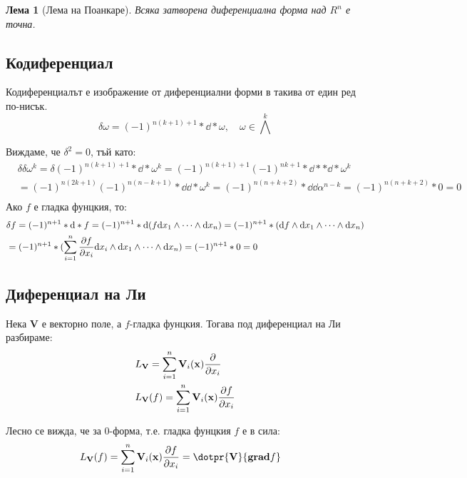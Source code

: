 \documentclass[12pt]{article}
\newtheorem{lemma}{Лема}
\begin{document}
\begin{large}
\begin{lemma}[Лема на Поанкаре]
  Всяка затворена диференциална форма над $R^n$ е точна.
\end{lemma}

\subsection{Кодиференциал}
Кодиференциалът е изображение от диференциални форми в такива от един ред по-нисък.
\[
  \delta \omega=(-1)^{n(k+1)+1}\ast \dd \ast \omega, \quad \omega \in {\bigwedge}^k
\]

Виждаме, че $\delta^2=0$, тъй като:
\begin{align*}
  &\delta \delta \omega^k = \delta (-1)^{n(k+1)+1}\ast \dd \ast \omega^k = (-1)^{n(k+1)+1} (-1)^{nk+1} \ast \dd \ast \ast \dd \ast \omega^k \\
  &= (-1)^{n(2k+1)} (-1)^{n(n-k+1)} \ast \dd \dd \ast \omega^k = (-1)^{n(n+k+2)} \ast \dd \dd \alpha^{n-k} = (-1)^{n(n+k+2)} \ast 0 = 0\\
\end{align*}
Ако $f$ е гладка фунцкия, то:
\begin{align*}
  &\delta f = (-1)^{n+1} \ast \dd \ast f = (-1)^{n+1} \ast \dd(f \dd x_1 \wedge \cdots \wedge \dd x_n) = (-1)^{n+1} \ast (\dd f \wedge \dd x_1 \wedge \cdots \wedge \dd x_n) \\
  &=(-1)^{n+1} \ast (\sum_{i=1}^{n} \pdv{f}{x_i} \dd x_i \wedge \dd x_1 \wedge \cdots \wedge \dd x_n) = (-1)^{n+1} \ast 0 = 0
\end{align*}

\subsection{Диференциал на Ли}
Нека $\mathbf{V}$ е векторно поле, а $f$-гладка фунцкия. Тогава под диференциал на Ли разбираме:
\begin{align*}
  &L_\mathbf{V} = \sum_{i=1}^{n}\mathbf{V}_i(\mathbf{x})\pdv{}{x_i} \\
  &L_\mathbf{V}(f)=\sum_{i=1}^{n}\mathbf{V}_i(\mathbf{x})\pdv{f}{x_i}
\end{align*}

Лесно се вижда, че за $0$-форма, т.е. гладка фунцкия $f$ е в сила:
\begin{align*}
  &L_\mathbf{V}(f)=\sum_{i=1}^{n}\mathbf{V}_i(\mathbf{x})\pdv{f}{x_i}= \dotpr{\mathbf{V}}{\mathbf{grad} f}
\end{align*}


\end{large}
\end{document}
